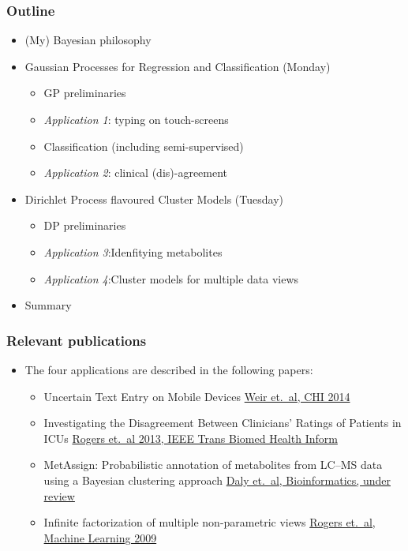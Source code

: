 \begin{frame}
	\frametitle{Outline}
	\begin{itemize}
		\item (My) Bayesian philosophy
		\item Gaussian Processes for Regression and Classification (Monday)
		\begin{itemize}
			\item GP preliminaries
			\item \emph{Application 1}: typing on touch-screens
			\item Classification (including semi-supervised)
			\item \emph{Application 2}: clinical (dis)-agreement
		\end{itemize}
		\item Dirichlet Process flavoured Cluster Models (Tuesday)
		\begin{itemize}
			\item DP preliminaries
			\item \emph{Application 3}:Idenfitying metabolites
			\item \emph{Application 4}:Cluster models for multiple data views
		\end{itemize}
		\item Summary
	\end{itemize}
\end{frame}

\begin{frame}
	\frametitle{Relevant publications}
	\begin{itemize}
		\item The four applications are described in the following papers:
		\begin{itemize}
			\item Uncertain Text Entry on Mobile Devices \href{http://dl.acm.org/citation.cfm?doid=2556288.2557412}{Weir et.~al, CHI 2014}
			\item Investigating the Disagreement Between Clinicians' Ratings of Patients in ICUs \href{http://dx.doi.org/10.1109/JBHI.2013.2252182}{Rogers et.~al 2013, IEEE Trans Biomed Health Inform}
			\item MetAssign: Probabilistic annotation of metabolites from LC--MS data using a Bayesian clustering approach \href{http://mzmatch.sourceforge.net/MetAssign.php}{Daly et.~al, Bioinformatics, under review}
			\item Infinite factorization of multiple non-parametric views \href{http://eprints.gla.ac.uk/5369/1/5369.pdf}{Rogers et.~al, Machine Learning 2009}
		\end{itemize}
	\end{itemize}
\end{frame}

